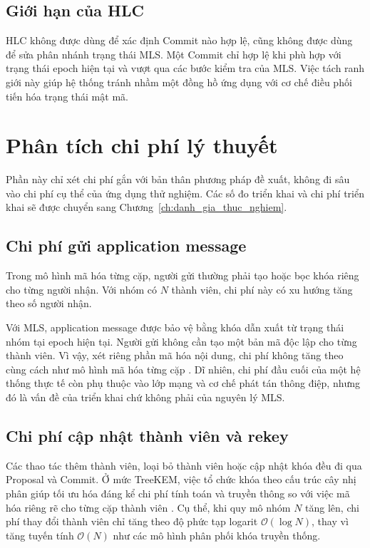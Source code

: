 \documentclass[../DoAn.tex]{subfiles}
\begin{document}
\subsection{Giới hạn của HLC}

HLC không được dùng để xác định Commit nào hợp lệ, cũng không được dùng để sửa phân nhánh trạng thái MLS. Một Commit chỉ hợp lệ khi phù hợp với trạng thái epoch hiện tại và vượt qua các bước kiểm tra của MLS. Việc tách ranh giới này giúp hệ thống tránh nhầm một đồng hồ ứng dụng với cơ chế điều phối tiến hóa trạng thái mật mã.

\section{Phân tích chi phí lý thuyết}
\label{sec:phan_tich_chi_phi_ly_thuyet}

Phần này chỉ xét chi phí gắn với bản thân phương pháp đề xuất, không đi sâu vào chi phí cụ thể của ứng dụng thử nghiệm. Các số đo triển khai và chi phí triển khai sẽ được chuyển sang Chương~\ref{ch:danh_gia_thuc_nghiem}.

\subsection{Chi phí gửi application message}

Trong mô hình mã hóa từng cặp, người gửi thường phải tạo hoặc bọc khóa riêng cho từng người nhận. Với nhóm có $N$ thành viên, chi phí này có xu hướng tăng theo số người nhận.

Với MLS, application message được bảo vệ bằng khóa dẫn xuất từ trạng thái nhóm tại epoch hiện tại. Người gửi không cần tạo một bản mã độc lập cho từng thành viên. Vì vậy, xét riêng phần mã hóa nội dung, chi phí không tăng theo cùng cách như mô hình mã hóa từng cặp \cite{rfc9420}. Dĩ nhiên, chi phí đầu cuối của một hệ thống thực tế còn phụ thuộc vào lớp mạng và cơ chế phát tán thông điệp, nhưng đó là vấn đề của triển khai chứ không phải của nguyên lý MLS.

\subsection{Chi phí cập nhật thành viên và rekey}

Các thao tác thêm thành viên, loại bỏ thành viên hoặc cập nhật khóa đều đi qua Proposal và Commit. Ở mức TreeKEM, việc tổ chức khóa theo cấu trúc cây nhị phân giúp tối ưu hóa đáng kể chi phí tính toán và truyền thông so với việc mã hóa riêng rẽ cho từng cặp thành viên \cite{rfc9420}. Cụ thể, khi quy mô nhóm $N$ tăng lên, chi phí thay đổi thành viên chỉ tăng theo độ phức tạp logarit $\mathcal{O}(\log N)$, thay vì tăng tuyến tính $\mathcal{O}(N)$ như các mô hình phân phối khóa truyền thống.
\end{document}
